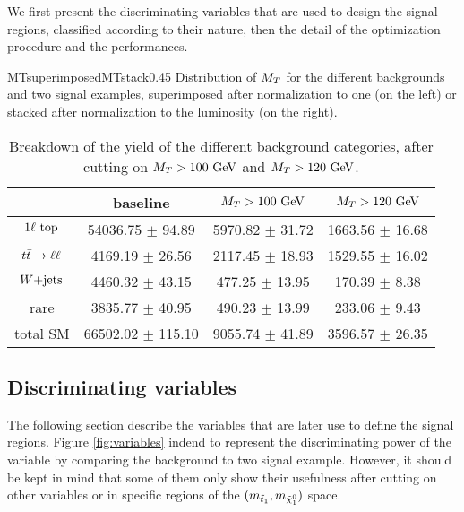     We first present the discriminating variables that are used to design the signal regions, classified
    according to their nature, then the detail of the optimization procedure and the performances.

                     {MTsuperimposed}{MTstack}{0.45}
                     {Distribution of $M_T$ for the different backgrounds and two signal examples,
                     superimposed after normalization to one (on the left) or stacked after normalization to the luminosity (on the right).}

    \begin{table}[h!]
        \centering
        \begin{tabular}{|c|ccc|}
            \hline
                         & baseline                 & $M_T > 100 ~\text{GeV}$          & $M_T > 120 ~\text{GeV}$           \\
            \hline
        $1\ell~\text{top}$  & 54036.75 $\pm$ 94.89     &  5970.82 $\pm$ 31.72      &  1663.56 $\pm$ 16.68       \\
        $t\bar{t} \rightarrow \ell \ell$   &  4169.19 $\pm$ 26.56     &  2117.45 $\pm$ 18.93      &  1529.55 $\pm$ 16.02       \\
        $\text{$W$+jets}$         &  4460.32 $\pm$ 43.15     &   477.25 $\pm$ 13.95      &   170.39 $\pm$ 8.38        \\
        rare             &  3835.77 $\pm$ 40.95     &   490.23 $\pm$ 13.99      &   233.06 $\pm$ 9.43        \\
            \hline
        total SM         & 66502.02 $\pm$ 115.10    &  9055.74 $\pm$ 41.89      & 3596.57 $\pm$ 26.35        \\
            \hline
        \end{tabular}
        \caption{Breakdown of the yield of the different background categories, after cutting on $M_T > 100 ~\text{GeV}$ and $M_T > 120 ~\text{GeV}$.}
        \label{tab:MTcutImpact}
    \end{table}

        \subsection{Discriminating variables}

        The following section describe the variables that are later use to define the signal regions. Figure \ref{fig:variables} indend to represent the discriminating power of the variable by comparing the background to two signal example. However, it should be kept in mind that some of them only show their usefulness after cutting on other variables or in specific regions of the $(m_{\tilde{t}_1},m_{\tilde{\chi}_1^0})$ space.

